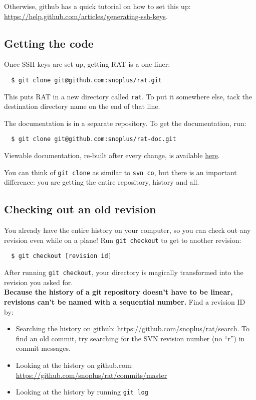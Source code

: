 \documentclass{article}
\begin{document}
Otherwise, github has a quick tutorial on how to set this up: \href{https://help.github.com/articles/generating-ssh-keys}{https://help.github.com/articles/generating-ssh-keys}.

\subsection{Getting the code}
Once SSH keys are set up, getting RAT is a one-liner:
\begin{verbatim}
  $ git clone git@github.com:snoplus/rat.git
\end{verbatim}
This puts RAT in a new directory called {\tt rat}. To put it somewhere else, tack the destination directory name on the end of that line.

The documentation is in a separate repository. To get the documentation, run:
\begin{verbatim}
  $ git clone git@github.com:snoplus/rat-doc.git
\end{verbatim}

Viewable documentation, re-built after every change, is available \href{http://ratbuild.hep.upenn.edu/snoplus/doc}{here}.

You can think of {\tt git clone} as similar to {\tt svn co}, but there is an important difference: you are getting the entire repository, history and all.

\subsection{Checking out an old revision}
You already have the entire history on your computer, so you can check out any revision even while on a plane! Run {\tt git checkout} to get to another revision:
\begin{verbatim}
  $ git checkout [revision id]
\end{verbatim}
After running {\tt git checkout}, your directory is magically transformed into the revision you asked for.\\

{\bf Because the history of a git repository doesn't have to be linear, revisions can't be named with a sequential number.} Find a revision ID by:
\begin{itemize}
\item Searching the history on github: \href{https://github.com/snoplus/rat/search}{https://github.com/snoplus/rat/search}. To find an old commit, try searching for the SVN revision number (no ``r'') in commit messages.
\item Looking at the history on github.com: \href{https://github.com/snoplus/rat/commits/master}{https://github.com/snoplus/rat/commits/master}
\item Looking at the history by running {\tt git log}
\end{itemize}
\end{document}
